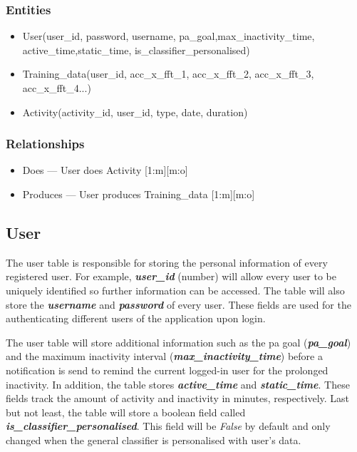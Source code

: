         \subsubsection{Entities}
        
        \begin{itemize}
            \item User(user\_id, password, username, pa\_goal,max\_inactivity\_time, active\_time,\newline static\_time, is\_classifier\_personalised)
            \item Training\_data(user\_id, acc\_x\_fft\_1, acc\_x\_fft\_2, acc\_x\_fft\_3, acc\_x\_fft\_4...)
            \item Activity(activity\_id, user\_id, type, date, duration)
        \end{itemize}
        
        \subsubsection{Relationships}
        \begin{itemize}
        \item Does --- User does Activity [1:m][m:o]
        \item Produces --- User produces Training\_data [1:m][m:o]
        \end{itemize}
        
        \subsection{User}
        The user table is responsible for storing the personal information of every registered user. For example, \textbf{\textit{user\_id}} (number) will allow every user to be uniquely identified so further information can be accessed. The table will also store the \textbf{\textit{username}} and \textbf{\textit{password}} of every user. These fields are used for the authenticating different users of the application upon login.
        
        The user table will store additional information such as the \gls{pa} goal (\textbf{\textit{pa\_goal}}) and the maximum inactivity interval (\textbf{\textit{max\_inactivity\_time}}) before a notification is send to remind the current logged-in user for the prolonged inactivity. In addition, the table stores \textbf{\textit{active\_time}} and \textbf{\textit{static\_time}}. These fields track the amount of activity and inactivity in minutes, respectively. Last but not least, the table will store a boolean field called \textbf{\textit{is\_classifier\_personalised}}. This field will be \textit{False} by default and only changed when the general classifier is personalised with user's data.
        
